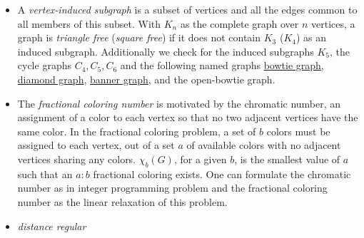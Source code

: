 \documentclass[12pt]{article}
\newcommand{\note}[1]{\todo[inline]{#1}}
\newcommand{\bowtiegraph}{\href{http://mathworld.wolfram.com/ButterflyGraph.html}{bowtie graph}}
\newcommand{\diamondgraph}{\href{http://mathworld.wolfram.com/DiamondGraph.html}{diamond graph}}
\newcommand{\bannergraph}{\href{http://mathworld.wolfram.com/BannerGraph.html}{banner graph}}
\begin{document}
\begin{appendices}
\begin{itemize}
\item A \textit{vertex-induced subgraph} is a subset of vertices and all the edges common to all members of this subset. 
With $K_n$ as the complete graph over $n$ vertices, a graph is \textit{triangle free} (\textit{square free}) if it does not contain $K_3$ ($K_4$) as an induced subgraph.
Additionally we check for the induced subgraphs $K_5$, the cycle graphs $C_4, C_5, C_6$ and the following named graphs \bowtiegraph, \diamondgraph, \bannergraph, and the open-bowtie graph. 

\item The \textit{fractional coloring number} is motivated by the chromatic number, an assignment of a color to each vertex so that no two adjacent vertices have the same color. 
In the fractional coloring problem, a set of $b$ colors must be assigned to each vertex, out of a set $a$ of available colors with no adjacent vertices sharing any colors.
$\chi_b(G)$, for a given $b$, is the smallest value of $a$ such that an $a:b$ fractional coloring exists. 
One can formulate the chromatic number as in integer programming problem and the fractional coloring number as the linear relaxation of this problem. \cite{scheinerman2011fractional}

\item \textit{distance regular}
\note{Complete def. here}

\end{itemize}


\end{appendices}
\end{document}
